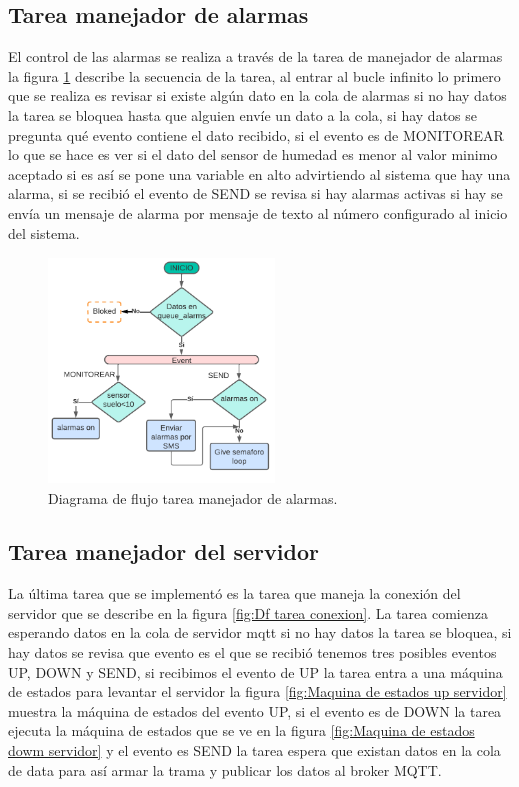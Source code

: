 \subsection{Tarea manejador de alarmas} 
El control de las alarmas se realiza a través de la tarea de manejador de alarmas la figura \ref{fig:Df tarea alarmas} describe la secuencia de la tarea, al entrar al bucle infinito lo primero que se realiza es revisar si existe algún dato en la cola de alarmas si no hay datos la tarea se bloquea hasta que alguien envíe un dato a la cola, si hay datos se pregunta qué evento contiene el dato recibido, si el evento es de MONITOREAR lo que se hace es ver si el dato del sensor de humedad es menor al valor minimo aceptado si es así se pone  una variable en alto advirtiendo al sistema que hay una alarma, si se recibió el evento de SEND se revisa si hay alarmas activas si hay se envía un mensaje de alarma por mensaje de texto al número configurado al inicio del sistema.
\begin{figure}[h]
  \centering
	\includegraphics[width=6cm, height=6cm]{./Figures/DF_alarms.png}
	\caption{Diagrama de flujo tarea manejador de alarmas.}
	\label{fig:Df tarea alarmas}
\end{figure}

\subsection{Tarea manejador del servidor } 
La última tarea que se implementó es la tarea que maneja la conexión del servidor que se describe en la figura \ref{fig:Df tarea conexion}.
La tarea comienza esperando datos en la cola de servidor mqtt si no hay datos la tarea se bloquea, si hay datos se revisa que evento es el que se recibió tenemos tres posibles eventos UP, DOWN y SEND, si recibimos el evento de UP la tarea entra a una máquina de estados para levantar el servidor la figura \ref{fig:Maquina de estados up servidor} muestra la máquina de estados del evento UP, si el evento es de DOWN la tarea ejecuta la máquina de estados que se ve en la figura \ref{fig:Maquina de estados dowm servidor} y el evento es SEND la tarea espera que existan datos en la cola de data para así armar la trama y publicar los datos al broker MQTT.

